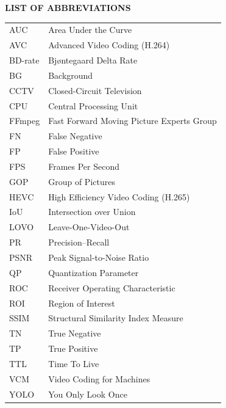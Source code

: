 
\clearpage
\begin{center}
    \textbf{\Large LIST OF ABBREVIATIONS}
\end{center}

\begin{longtable}{@{}ll@{}}
AUC                 & Area Under the Curve \\
AVC                 & Advanced Video Coding (H.264) \\
BD-rate             & Bj{\o}ntegaard Delta Rate \\
BG                  & Background \\
CCTV                & Closed-Circuit Television \\
CPU                 & Central Processing Unit \\
FFmpeg              & Fast Forward Moving Picture Experts Group \\
FN                  & False Negative \\
FP                  & False Positive \\
FPS                 & Frames Per Second \\
GOP                 & Group of Pictures \\
HEVC                & High Efficiency Video Coding (H.265) \\
IoU                 & Intersection over Union \\
LOVO                & Leave-One-Video-Out \\
PR                  & Precision--Recall \\
PSNR                & Peak Signal-to-Noise Ratio \\
QP                  & Quantization Parameter \\
ROC                 & Receiver Operating Characteristic \\
ROI                 & Region of Interest \\
SSIM                & Structural Similarity Index Measure \\
TN                  & True Negative \\
TP                  & True Positive \\
TTL                 & Time To Live \\
VCM                 & Video Coding for Machines \\
YOLO                & You Only Look Once \\
\end{longtable}
